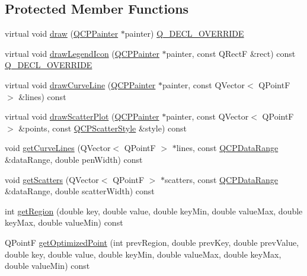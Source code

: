 \subsection*{Protected Member Functions}
\begin{DoxyCompactItemize}
\item 
virtual void \hyperlink{class_q_c_p_curve_ac199d41d23865cd68bd7b598308a4433}{draw} (\hyperlink{class_q_c_p_painter}{Q\+C\+P\+Painter} $\ast$painter) \hyperlink{qcustomplot_8h_a42cc5eaeb25b85f8b52d2a4b94c56f55}{Q\+\_\+\+D\+E\+C\+L\+\_\+\+O\+V\+E\+R\+R\+I\+DE}
\item 
virtual void \hyperlink{class_q_c_p_curve_aac6e94afbce4002d2cd7793250154e84}{draw\+Legend\+Icon} (\hyperlink{class_q_c_p_painter}{Q\+C\+P\+Painter} $\ast$painter, const Q\+RectF \&rect) const \hyperlink{qcustomplot_8h_a42cc5eaeb25b85f8b52d2a4b94c56f55}{Q\+\_\+\+D\+E\+C\+L\+\_\+\+O\+V\+E\+R\+R\+I\+DE}
\item 
virtual void \hyperlink{class_q_c_p_curve_aa4d7415f7c69eb7820263941f7d88e2c}{draw\+Curve\+Line} (\hyperlink{class_q_c_p_painter}{Q\+C\+P\+Painter} $\ast$painter, const Q\+Vector$<$ Q\+PointF $>$ \&lines) const
\item 
virtual void \hyperlink{class_q_c_p_curve_a0bea811373c5ee8c67c9c2b4d74ad866}{draw\+Scatter\+Plot} (\hyperlink{class_q_c_p_painter}{Q\+C\+P\+Painter} $\ast$painter, const Q\+Vector$<$ Q\+PointF $>$ \&points, const \hyperlink{class_q_c_p_scatter_style}{Q\+C\+P\+Scatter\+Style} \&style) const
\item 
void \hyperlink{class_q_c_p_curve_aefca1e5127fae2d7ff65b9e921637c58}{get\+Curve\+Lines} (Q\+Vector$<$ Q\+PointF $>$ $\ast$lines, const \hyperlink{class_q_c_p_data_range}{Q\+C\+P\+Data\+Range} \&data\+Range, double pen\+Width) const
\item 
void \hyperlink{class_q_c_p_curve_a564c5fdc8409e3532b1322389a8434b8}{get\+Scatters} (Q\+Vector$<$ Q\+PointF $>$ $\ast$scatters, const \hyperlink{class_q_c_p_data_range}{Q\+C\+P\+Data\+Range} \&data\+Range, double scatter\+Width) const
\item 
int \hyperlink{class_q_c_p_curve_a77c89253397c4754b40d4bc8d3e789bf}{get\+Region} (double key, double value, double key\+Min, double value\+Max, double key\+Max, double value\+Min) const
\item 
Q\+PointF \hyperlink{class_q_c_p_curve_a1d4530a81f718a2085df03d6a059d5d8}{get\+Optimized\+Point} (int prev\+Region, double prev\+Key, double prev\+Value, double key, double value, double key\+Min, double value\+Max, double key\+Max, double value\+Min) const

\end{DoxyCompactItemize}
